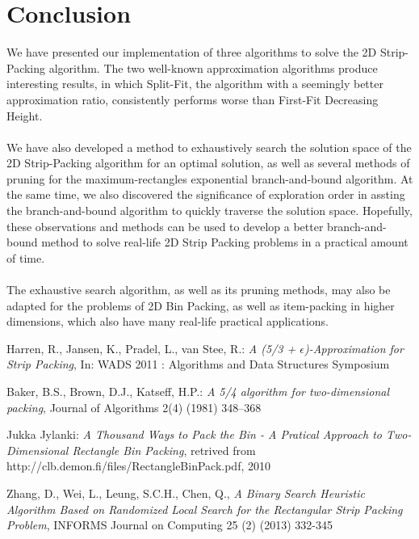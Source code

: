 \documentclass{article}
\begin{document}
\section{Conclusion}
We have presented our implementation of three algorithms to solve the 2D Strip-Packing algorithm. The two well-known approximation algorithms produce interesting results, in which Split-Fit, the algorithm with a seemingly better approximation ratio, consistently performs worse than First-Fit Decreasing Height.\\
\\
We have also developed a method to exhaustively search the solution space of the 2D Strip-Packing algorithm for an optimal solution, as well as several methods of pruning for the maximum-rectangles exponential branch-and-bound algorithm. At the same time, we also discovered the significance of exploration order in assting the branch-and-bound algorithm to quickly traverse the solution space. Hopefully, these observations and methods can be used to develop a better branch-and-bound method to solve real-life 2D Strip Packing problems in a practical amount of time.\\
\\
The exhaustive search algorithm, as well as its pruning methods, may also be adapted for the problems of 2D Bin Packing, as well as item-packing in higher dimensions, which also have many real-life practical applications.

\begin{thebibliography}{9}
  Harren, R., Jansen, K., Pradel, L., van Stee, R.:
  \emph{A (5/3 + $\epsilon$)-Approximation for Strip Packing},
  In: WADS 2011 : Algorithms and Data Structures Symposium

  Baker, B.S., Brown, D.J., Katseff, H.P.:
  \emph{A 5/4 algorithm for two-dimensional packing},
  Journal of Algorithms 2(4) (1981) 348–368

  Jukka Jylanki:
  \emph{A Thousand Ways to Pack the Bin - A Pratical Approach to Two-Dimensional Rectangle Bin Packing},
  retrived from http://clb.demon.fi/files/RectangleBinPack.pdf, 2010

  Zhang, D., Wei, L., Leung, S.C.H., Chen, Q.,
  \emph{A Binary Search Heuristic Algorithm Based on Randomized Local Search for the Rectangular Strip Packing Problem},
  INFORMS Journal on Computing 25 (2) (2013) 332-345
\end{thebibliography}
\end{document}
